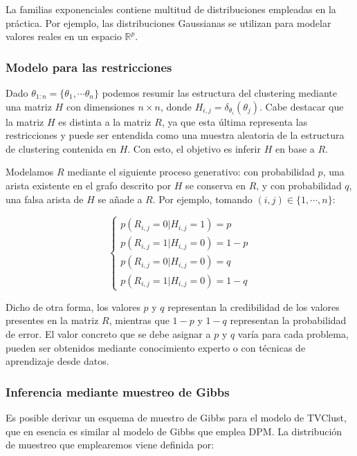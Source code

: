 La familias exponenciales contiene multitud de distribuciones empleadas en la práctica. Por ejemplo, las distribuciones Gaussianas se utilizan para modelar valores reales en un espacio $\mathbb{R}^p$. 

\subsubsection{Modelo para las restricciones}

Dado $\theta_{1:n} = \{\theta_1, \cdots \theta_n\}$ podemos resumir las estructura del clustering mediante una matriz $H$ con dimensiones $n\times n$, donde $H_{i,j} = \delta_{\theta_i}(\theta_j)$. Cabe destacar que la matriz $H$ es distinta a la matriz $R$, ya que esta última representa las restricciones y puede ser entendida como una muestra aleatoria de la estructura de clustering contenida en $H$. Con esto, el objetivo es inferir $H$ en base a $R$.

Modelamos $R$ mediante el siguiente proceso generativo: con probabilidad $p$, una arista existente en el grafo descrito por $H$ se conserva en $R$, y con probabilidad $q$, una falsa arista de $H$ se añade a $R$. Por ejemplo, tomando $(i,j) \in \{1, \cdots, n\}$:

\begin{equation}
\begin{cases}
p(R_{i,j} = 0 | H_{i,j} = 1) = p\\
p(R_{i,j} = 1 | H_{i,j} = 0) = 1 - p\\
p(R_{i,j} = 0 | H_{i,j} = 0) = q\\
p(R_{i,j} = 1 | H_{i,j} = 0) = 1 - q
\end{cases}
\label{eqn50}
\end{equation}

Dicho de otra forma, los valores $p$ y $q$ representan la credibilidad de los valores presentes en la matriz $R$, mientras que $1 - p$ y $1 - q$ representan la probabilidad de error. El valor concreto que se debe asignar a $p$ y $q$ varía para cada problema, pueden ser obtenidos mediante conocimiento experto o con técnicas de aprendizaje desde datos.

\subsubsection{Inferencia mediante muestreo de Gibbs}

Es posible derivar un esquema de muestro de Gibbs para el modelo de TVClust, que en esencia es similar al modelo de Gibbs que emplea \acf{DPM}. La distribución de muestreo que emplearemos viene definida por:

